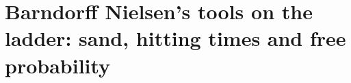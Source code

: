 \chapter{Barndorff Nielsen's tools on the ladder: sand, hitting times and free probability}\label{vol3:ch34}

